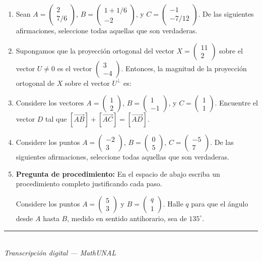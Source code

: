 \documentclass[11pt]{article}
\newcommand{\vect}[2]{\begin{pmatrix}#1\\#2\end{pmatrix}}
\newcommand{\examfooter}{\vfill\rule{\linewidth}{0.4pt}\\[1pt]{\scriptsize\textit{Transcripción digital --- MathUNAL}\hfill\textcolor{unalblue}{\textbf{\thepage}}}}
\begin{document}
\begin{enumerate}
\item Sean $A=\vect{2}{7/6}$, $B=\vect{1+1/6}{-2}$, y $C=\vect{-1}{-7/12}$. De las siguientes afirmaciones, seleccione todas aquellas que son verdaderas.

\item Supongamos que la proyección ortogonal del vector $X=\vect{11}{2}$ sobre el vector $U\neq 0$ es el vector $\vect{3}{-4}$. Entonces, la magnitud de la proyección ortogonal de $X$ sobre el vector $U^\perp$ es:

\item Considere los vectores $A=\vect{1}{2}$, $B=\vect{1}{-1}$, y $C=\vect{1}{1}$. Encuentre el vector $D$ tal que $[\overrightarrow{AB}]+[\overrightarrow{AC}]=[\overrightarrow{AD}]$.

\item Considere los puntos $A=\vect{-2}{3}$, $B=\vect{0}{5}$, $C=\vect{-5}{7}$. De las siguientes afirmaciones, seleccione todas aquellas que son verdaderas.

\item \textbf{Pregunta de procedimiento:} En el espacio de abajo escriba un procedimiento completo justificando cada paso.

Considere los puntos $A=\vect{5}{3}$ y $B=\vect{q}{1}$. Halle $q$ para que el ángulo desde $A$ hasta $B$, medido en sentido antihorario, sea de $135^\circ$.
\end{enumerate}

\examfooter
\end{document}
